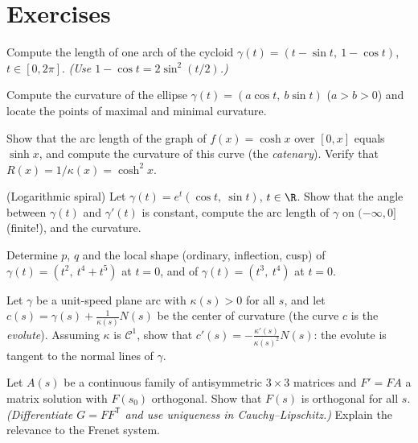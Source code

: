 \section{Exercises}

\begin{exercise}[$\star$]\label{exo:b2:curves:1}
Compute the length of one arch of the cycloid $\gamma(t) = (t -
\sin t,\ 1 - \cos t)$, $t \in [0, 2\pi]$. \emph{(Use $1 - \cos t =
2\sin^2(t/2)$.)}
\end{exercise}

\begin{exercise}[$\star$]\label{exo:b2:curves:2}
Compute the curvature of the ellipse $\gamma(t) = (a\cos t,\ b\sin
t)$ ($a > b > 0$) and locate the points of maximal and minimal
curvature.
\end{exercise}

\begin{exercise}[$\star$]\label{exo:b2:curves:3}
Show that the arc length of the graph of $f(x) = \cosh x$ over
$[0, x]$ equals $\sinh x$, and compute the curvature of this
curve (the \emph{catenary}). Verify that $R(x) = 1/\kappa(x) =
\cosh^2 x$.
\end{exercise}

\begin{exercise}[$\star\star$]\label{exo:b2:curves:4}
(Logarithmic spiral) Let $\gamma(t) = e^{t}(\cos t,\ \sin t)$, $t
\in \R$.
Show that the angle between $\gamma(t)$ and $\gamma'(t)$ is
constant, compute the arc length of $\gamma$ on $(-\infty, 0]$
(finite!), and the curvature.
\end{exercise}

\begin{exercise}[$\star\star$]\label{exo:b2:curves:5}
Determine $p$, $q$ and the local shape (ordinary, inflection,
cusp) of $\gamma(t) = (t^2,\ t^4 + t^5)$ at $t = 0$, and of
$\gamma(t) = (t^3,\ t^4)$ at $t = 0$.
\end{exercise}

\begin{exercise}[$\star\star$]\label{exo:b2:curves:6}
Let $\gamma$ be a unit-speed plane arc with $\kappa(s) > 0$ for
all $s$, and let $c(s) = \gamma(s) + \frac{1}{\kappa(s)}N(s)$ be
the center of curvature (the curve $c$ is the \emph{evolute}).
Assuming $\kappa$ is $\mathcal{C}^1$, show that $c'(s) =
-\frac{\kappa'(s)}{\kappa(s)^2}N(s)$: the evolute is tangent to
the normal lines of $\gamma$.
\end{exercise}

\begin{exercise}[$\star\star\star$]\label{exo:b2:curves:7}
Let $A(s)$ be a continuous family of antisymmetric $3 \times 3$
matrices and $F' = F A$ a matrix solution with $F(s_0)$
orthogonal. Show that $F(s)$ is orthogonal for all $s$.
\emph{(Differentiate $G = F F^{\mathsf T}$ and use uniqueness in
Cauchy--Lipschitz.)} Explain the relevance to the Frenet system.
\end{exercise}

